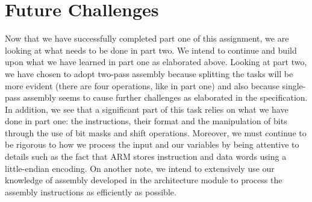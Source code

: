 \documentclass[10pt]{article}
\begin{document}
\section*{Future Challenges}
\hspace*{0.6cm} Now that we have successfully completed part one of this assignment, we are looking at what needs to be done in part two. We intend to continue and build upon what we have learned in part one as elaborated above. 
Looking at part two, we have chosen to adopt two-pass assembly because splitting the tasks will be more evident (there are four operations, like in part one) and also because single-pass assembly seems to cause further challenges as elaborated in the specification. 
In addition, we see that a significant part of this task relies on what we have done in part one: the instructions, their format and the manipulation of bits through the use of bit masks and shift operations.
Moreover, we must continue to be rigorous to how we process the input and our variables by being attentive to details such as the fact that ARM stores instruction and data words using a little-endian encoding.
On another note, we intend to extensively use our knowledge of assembly developed in the architecture module to process the assembly instructions as efficiently as possible.
\end{document}
